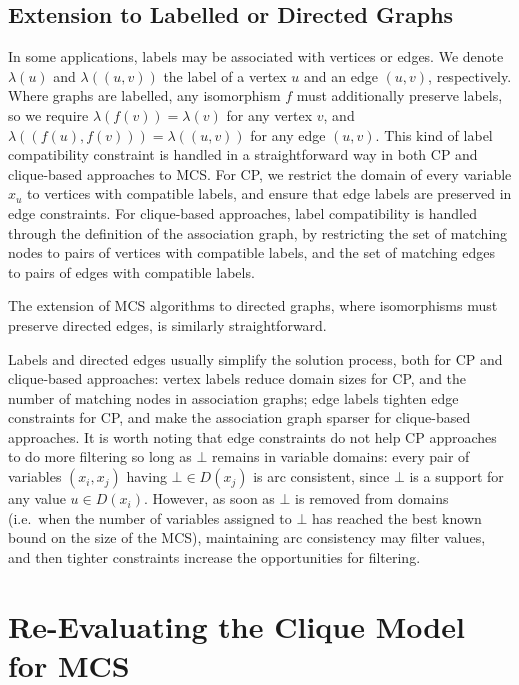 \documentclass{llncs}
\begin{document}
\subsection{Extension to Labelled or Directed Graphs}\label{extension}

In some applications, labels may be associated with vertices or edges. We denote $\lambda(u)$ and
$\lambda((u, v))$ the label of a vertex $u$ and an edge $(u, v)$, respectively. Where graphs are
labelled, any isomorphism $f$ must additionally preserve labels, so we require $\lambda(f(v)) =
\lambda(v)$ for any vertex $v$, and $\lambda((f(u), f(v))) = \lambda((u, v))$ for any edge $(u, v)$.
This kind of label compatibility constraint is handled in a straightforward way in both CP and
clique-based approaches to MCS.  For CP, we restrict the domain of every variable $x_u$ to vertices
with compatible labels, and ensure that edge labels are preserved in edge constraints.
For clique-based approaches, label compatibility is handled through the definition of the
association graph, by restricting the set of matching nodes to pairs of vertices with compatible
labels, and the set of matching edges to pairs of edges with compatible labels.

The extension of MCS algorithms to directed graphs, where isomorphisms must preserve directed edges,
is similarly straightforward.

Labels and directed edges usually simplify the solution process, both for CP and clique-based
approaches: vertex labels reduce domain sizes for CP, and the number of matching nodes in
association graphs; edge labels tighten edge constraints for CP, and make the association graph
sparser for clique-based approaches. It is worth noting that edge constraints do not help CP
approaches to do more filtering so long as $\bot$ remains in variable domains: every pair of
variables $(x_i, x_j)$ having  $\bot \in D(x_j)$ is arc consistent,
since $\bot$ is a support for any value $u \in D(x_i)$. However, as soon as $\bot$ is removed from
domains (i.e.\ when the number of variables assigned to $\bot$ has reached the best known bound on
the size of the MCS), maintaining arc consistency may filter values, and then tighter constraints
increase the opportunities for filtering.

\section{Re-Evaluating the Clique Model for MCS}\label{eval1}
\end{document}
